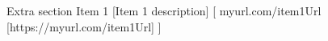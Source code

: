 \documentclass[
]{llresume}
\newcommand{\hide}[1]
{}
\begin{document}
\begin{mainpane}
        \begin{mainsection}
            {Extra section} %
                    \entryGeneric
                    {Item 1} %
                    [Item 1 description] %
                        [
                            \infoGeneric
                            {\faGlobe}%
                            {myurl.com/item1Url}%
                            [https://myurl.com/item1Url] %
                        ]
        \end{mainsection}

\end{mainpane}

\hide{}
\end{document}
